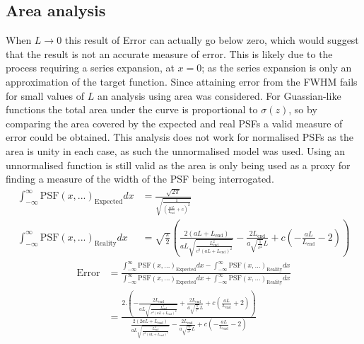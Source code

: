 \subsection{Area analysis}
When $L\to0$ this result of Error can actually go below zero, which would suggest that the result is not an accurate measure of error.
This is likely due to the process requiring a series expansion, at $x=0$; as the series expansion is only an approximation of the target function.
Since attaining error from the FWHM fails for small values of $L$ an analysis using area was considered.
For Guassian-like functions the total area under the curve is proportional to $\sigma(z)$, so by comparing the area covered by the expected and real PSFs a valid measure of error could be obtained.
This analysis does not work for normalised PSFs as the area is unity in each case, as such the unnormalised model was used.
Using an unnormalised function is still valid as the area is only being used as a proxy for finding a measure of the width of the PSF being interrogated.
\begin{align*}
  \int_{-\infty}^{\infty} \text{PSF}(x,...)_{\text{Expected}} dx &= \frac{\sqrt{2 \pi }}{\sqrt{\frac{1}{\left(\frac{a c L}{L_{\text{end}}}+c\right)^2}}}\\
  \int_{-\infty}^{\infty} \text{PSF}(x,...)_{\text{Reality}} dx &=\sqrt{\frac{\pi }{2}} \left(\frac{2 (a L+L_{\text{end}})}{a L \sqrt{\frac{L_{\text{end}}^2}{c^2 (a L+L_{\text{end}})^2}}}-\frac{2 L_{\text{end}}}{a \sqrt{\frac{1}{c^2}} L}+c \left(-\frac{a L}{L_{\text{end}}}-2\right)\right)
\end{align*}
\begin{align*}
  \text{Error} &= \frac{\int_{-\infty}^{\infty} \text{PSF}(x,...)_{\text{Expected}} dx - \int_{-\infty}^{\infty} \text{PSF}(x,...)_{\text{Reality}}dx}
  {\int_{-\infty}^{\infty} \text{PSF}(x,...)_{\text{Expected}} dx + \int_{-\infty}^{\infty} \text{PSF}(x,...)_{\text{Reality}}dx} \\
  &= \frac{2. \left(-\frac{2 L_{\text{end}}}{a L \sqrt{\frac{L_{\text{end}}^2}{c^2 (a L+L_{\text{end}})^2}}}+\frac{2 L_{\text{end}}}{a \sqrt{\frac{1}{c^2}} L}+c \left(\frac{a L}{L_{\text{end}}}+2\right)\right)}{\frac{2 (2 a L+L_{\text{end}})}{a L \sqrt{\frac{L_{\text{end}}^2}{c^2 (a L+L_{\text{end}})^2}}}-\frac{2 L_{\text{end}}}{a \sqrt{\frac{1}{c^2}} L}+c \left(-\frac{a L}{L_{\text{end}}}-2\right)}
\end{align*}
